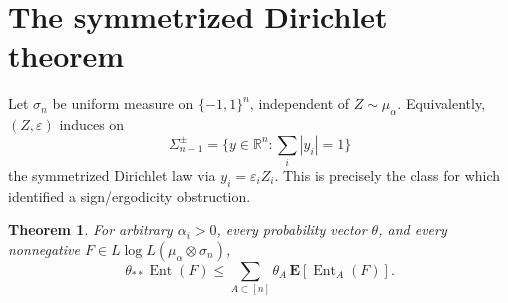 \documentclass[11pt,a4paper]{article}
\newtheorem{theorem}{Theorem}
\newcommand{\E}{\mathbf E}
\newcommand{\Ent}{\operatorname{Ent}}
\newcommand{\R}{\mathbb R}
\newcommand{\eps}{\varepsilon}
\begin{document}
\section*{The symmetrized Dirichlet theorem}
Let $\sigma_n$ be uniform measure on $\{-1,1\}^n$, independent of
$Z\sim\mu_\alpha$.  Equivalently, $(Z,\eps)$ induces on
\[
 \Sigma_{n-1}^{\pm}=\{y\in\R^n:\textstyle\sum_i|y_i|=1\}
\]
the symmetrized Dirichlet law via $y_i=\eps_iZ_i$.  This is precisely the
class for which \cite[Remark 16, p.~14]{BCELM} identified a sign/ergodicity
obstruction.

\begin{theorem}\label{thm:sym-dir}
For arbitrary $\alpha_i>0$, every probability vector $\theta$, and every
nonnegative $F\in L\log L(\mu_\alpha\otimes\sigma_n)$,
\begin{equation}\label{eq:joint}
 \theta_{**}\Ent(F)
 \le\sum_{A\subset[n]}\theta_A\,
       \E[\Ent_A(F)].
\end{equation}
\end{theorem}
\end{document}
